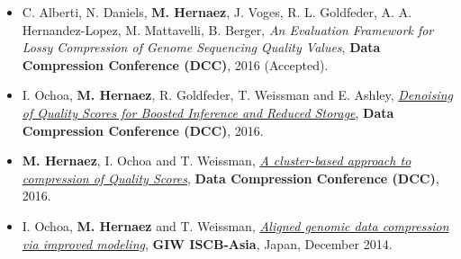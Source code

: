 \documentclass[11pt,a4paper,sans]{moderncv}        %
\begin{document}
\begin{itemize}


\item C. Alberti, N. Daniels, \textbf{M. Hernaez}, J. Voges, R. L. Goldfeder, A. A. Hernandez-Lopez, M. Mattavelli, B. Berger, \emph{An Evaluation Framework for Lossy Compression of Genome Sequencing Quality Values},  {\textbf{ Data Compression Conference (DCC)}}, 2016 (Accepted). \\

\item I. Ochoa, \textbf{M. Hernaez}, R. Goldfeder, T. Weissman and E. Ashley, \href{http://web.stanford.edu/~iochoa/publishedPublications/2015_dcc_denoising.pdf}{\emph{ Denoising of Quality Scores for Boosted Inference and Reduced Storage}}, {\textbf{ Data Compression Conference (DCC)}}, 2016. \\

\item  \textbf{M. Hernaez}, I. Ochoa and T. Weissman, \href{http://web.stanford.edu/~iochoa/publishedPublications/2015_dcc_markovmixture.pdf}{\emph{ A cluster-based approach to compression of Quality Scores}}, {\textbf{ Data Compression Conference (DCC)}}, 2016. \\
 


\item I. Ochoa, \textbf{M. Hernaez} and T. Weissman, \href{http://web.stanford.edu/~iochoa/publishedPublications/2014_cbc.pdf}{\emph{ Aligned genomic data compression via improved modeling}}, \textbf{GIW ISCB-Asia}, Japan, December 2014. \\


\end{itemize}
\end{document}

